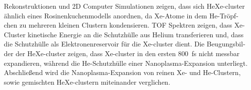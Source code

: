 \begin{otherlanguage}{german}
Rekonstruktionen und 2D Computer Simulationen zeigen, dass sich HeXe-cluster ähnlich eines Rosinenkuchenmodells anordnen, da Xe-Atome in dem He-Tröpfchen zu mehreren kleinen Clustern kondensieren. TOF Spektren zeigen, dass Xe-Cluster kinetische Energie an die Schutzhülle aus Helium transferieren und, dass die Schutzhülle als Elektronenreservoir für die Xe-cluster dient. Die Beugungsbilder der HeXe-cluster zeigen, dass Xe-cluster in den ersten \SI{800}{\femto\second} nicht messbar expandieren, während die He-Schutzhülle einer Nanoplasma-Expansion unterliegt. Abschließend wird die Nanoplasma-Expansion von reinen Xe- und He-Clustern, sowie gemischten HeXe-clustern miteinander verglichen.
\end{otherlanguage}